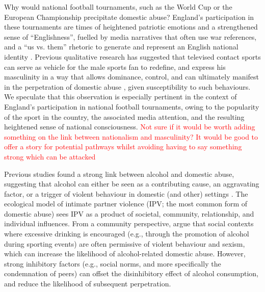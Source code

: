 \documentclass[12pt, a4paper]{article}
\newcommand{\AT}[1]{\textcolor{red}{#1}}
\begin{document}
Why would national football tournaments, such as the World Cup or the European Championship precipitate domestic abuse? England's participation in these tournaments are times of heightened patriotic emotions and a strengthened sense of ``Englishness'', fuelled by media narratives that often use war references, and a ``us vs. them'' rhetoric to generate and represent an English national identity \cite{Vincent2014}. Previous qualitative research has suggested that televised contact sports can serve as vehicle for the male sports fan to redefine, and express his masculinity in a way that allows dominance, control, and can ultimately manifest in the perpetration of domestic abuse \cite{Sabo,Swallow}, given susceptibility to such behaviours. We speculate that this observation is especially pertinent in the context of England's participation in national football tournaments, owing to the popularity of the sport in the country, the associated media attention, and the resulting heightened sense of national consciousness. \AT{Not sure if it would be worth adding something on the link between nationalism and masculinity? It would be good to offer a story for potential pathways whilst avoiding having to say something strong which can be attacked}


Previous studies found a strong link between alcohol and domestic abuse, suggesting that alcohol can either be seen as a contributing cause, an aggravating factor, or a trigger of violent behaviour in domestic (and other) settings \cite{Leonard2017}. The ecological model of intimate partner violence (IPV; the most common form of domestic abuse) sees IPV as a product of societal, community, relationship, and individual influences. From a community perspective,  argue that social contexts where excessive drinking is encouraged (e.g., through the promotion of alcohol during sporting events) are often permissive of violent behaviour and sexism, which can increase the likelihood of alcohol-related domestic abuse. However, strong inhibitory factors (e.g., social norms, and more specifically the condemnation of peers) can offset the disinhibitory effect of alcohol consumption, and reduce the likelihood of subsequent perpetration.  

\end{document}

